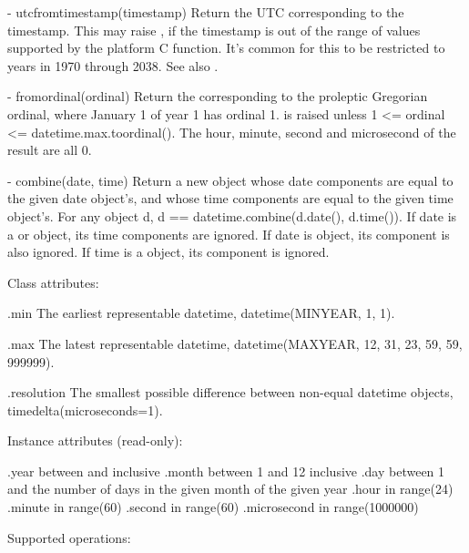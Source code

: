   - utcfromtimestamp(timestamp)
    Return the UTC  corresponding to the \POSIX{}
    timestamp.  This may raise , if the
    timestamp is out of the range of values supported by the platform
    C  function.  It's common for this to be
    restricted to years in 1970 through 2038.
    See also .

  - fromordinal(ordinal)
    Return the  corresponding to the proleptic
    Gregorian ordinal, where January 1 of year 1 has ordinal 1.
     is raised unless 1 <= ordinal <=
    datetime.max.toordinal().  The hour, minute, second and
    microsecond of the result are all 0.

  - combine(date, time)
    Return a new  object whose date components are
    equal to the given date object's, and whose time components are
    equal to the given time object's.  For any  object
    d, d == datetime.combine(d.date(), d.time()).
    If date is a  or  object, its
    time components are ignored.  If date is 
    object, its  component is also ignored.  If time is
    a  object, its  component is ignored.

Class attributes:

    .min
        The earliest representable datetime,
        datetime(MINYEAR, 1, 1).

    .max
        The latest representable datetime,
        datetime(MAXYEAR, 12, 31, 23, 59, 59, 999999).

    .resolution
        The smallest possible difference between non-equal datetime
        objects, timedelta(microseconds=1).

Instance attributes (read-only):

    .year           between  and  inclusive
    .month          between 1 and 12 inclusive
    .day            between 1 and the number of days in the given month
                    of the given year
    .hour           in range(24)
    .minute         in range(60)
    .second         in range(60)
    .microsecond    in range(1000000)

Supported operations:

